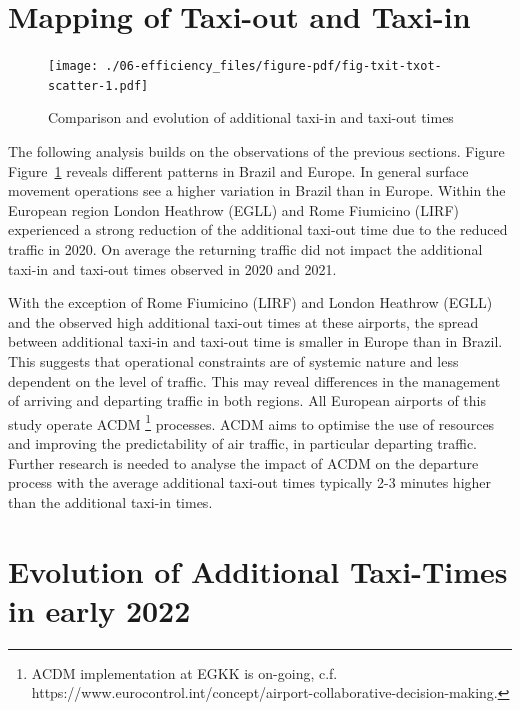 \documentclass[
  a4paper,
  DIV=11,
  numbers=noendperiod]{scrreprt}
\begin{document}
\hypertarget{mapping-of-taxi-out-and-taxi-in}{%
\section{Mapping of Taxi-out and
Taxi-in}\label{mapping-of-taxi-out-and-taxi-in}}

\begin{figure}[h]

{\centering \texttt{[image: ./06-efficiency\_files/figure-pdf/fig-txit-txot-scatter-1.pdf]}

}

\caption{\label{fig-txit-txot-scatter}Comparison and evolution of
additional taxi-in and taxi-out times}

\end{figure}

The following analysis builds on the observations of the previous
sections. Figure Figure~\ref{fig-txit-txot-scatter} reveals different
patterns in Brazil and Europe. In general surface movement operations
see a higher variation in Brazil than in Europe. Within the European
region London Heathrow (EGLL) and Rome Fiumicino (LIRF) experienced a
strong reduction of the additional taxi-out time due to the reduced
traffic in 2020. On average the returning traffic did not impact the
additional taxi-in and taxi-out times observed in 2020 and 2021.

With the exception of Rome Fiumicino (LIRF) and London Heathrow (EGLL)
and the observed high additional taxi-out times at these airports, the
spread between additional taxi-in and taxi-out time is smaller in Europe
than in Brazil. This suggests that operational constraints are of
systemic nature and less dependent on the level of traffic. This may
reveal differences in the management of arriving and departing traffic
in both regions. All European airports of this study operate ACDM
\footnote{ACDM implementation at EGKK is on-going, c.f.
  https://www.eurocontrol.int/concept/airport-collaborative-decision-making.}
processes. ACDM aims to optimise the use of resources and improving the
predictability of air traffic, in particular departing traffic. Further
research is needed to analyse the impact of ACDM on the departure
process with the average additional taxi-out times typically 2-3 minutes
higher than the additional taxi-in times.

\hypertarget{evolution-of-additional-taxi-times-in-early-2022}{%
\section{Evolution of Additional Taxi-Times in early
2022}\label{evolution-of-additional-taxi-times-in-early-2022}}
\end{document}
